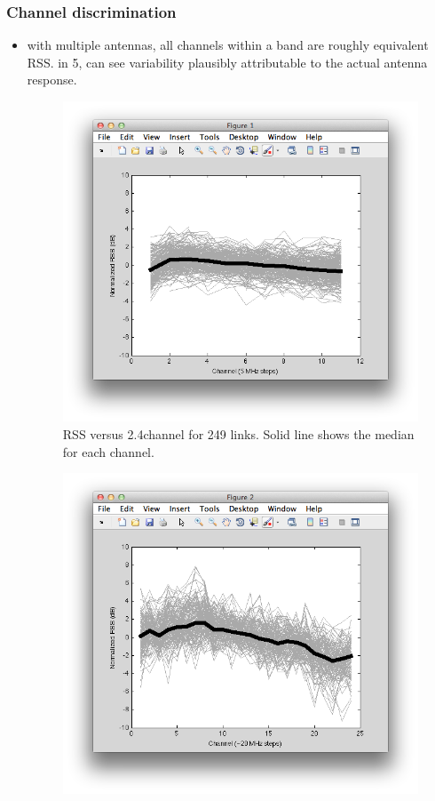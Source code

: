 \subsubsection{Channel discrimination}
\begin{itemize}
\item with multiple antennas, all channels within a band are roughly equivalent RSS. in 5\GHz, can see variability plausibly attributable to the actual antenna response.

\begin{figure}[htp]
	\centering
	\includegraphics[width=\textwidth]{figures/esnr/rssi_vs_freq_24.png}
	\caption{\label{fig:rssi_vs_freq_24}RSS versus 2.4\GHz channel for 249 links. Solid line shows the median for each channel.}
\end{figure}
\begin{figure}[htp]
	\centering
	\includegraphics[width=\textwidth]{figures/esnr/rssi_vs_freq_5.png}

\end{figure}
\end{itemize}
